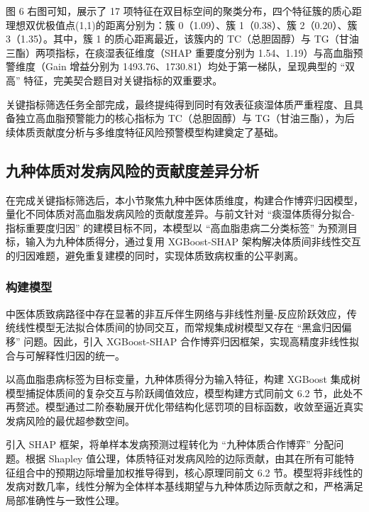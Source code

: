 \documentclass[12pt]{article}
\begin{document}
	{\songti{}
		图 6 右图可知，展示了 17 项特征在双目标空间的聚类分布，四个特征簇的质心距理想双优极值点(1,1)的距离分别为：簇 0（1.09）、簇 1（0.38）、簇 2（0.20）、簇 3（1.35）。其中，簇 1 的质心距离最近，该簇内的 TC（总胆固醇）与 TG（甘油三酯）两项指标，在痰湿表征维度（SHAP 重要度分别为 1.54、1.19）与高血脂预警维度（Gain 增益分别为 1493.76、1730.81）均处于第一梯队，呈现典型的 “双高” 特征，完美契合题目对关键指标的双重要求。
		\par}
	
	{\songti{}
		关键指标筛选任务全部完成，最终提纯得到同时有效表征痰湿体质严重程度、且具备独立高血脂预警能力的核心指标为 TC（总胆固醇）与 TG（甘油三酯），为后续体质贡献度分析与多维度特征风险预警模型构建奠定了基础。
		\par}
	
	\subsection{九种体质对发病风险的贡献度差异分析}
	{\songti{}
		在完成关键指标筛选后，本小节聚焦九种中医体质维度，构建合作博弈归因模型，量化不同体质对高血脂发病风险的贡献度差异。与前文针对 “痰湿体质得分拟合-指标重要度归因” 的建模目标不同，本模型以 “高血脂患病二分类标签” 为预测目标，输入为九种体质得分，通过复用 XGBoost-SHAP 架构解决体质间非线性交互的归因难题，避免重复建模的同时，实现体质致病权重的公平剥离。
		\par}
	
	\subsubsection{构建模型}
	{\songti{}
		中医体质致病路径中存在显著的非互斥伴生网络与非线性剂量-反应阶跃效应，传统线性模型无法拟合体质间的协同交互，而常规集成树模型又存在 “黑盒归因偏移” 问题。因此，引入 XGBoost-SHAP 合作博弈归因框架，实现高精度非线性拟合与可解释性归因的统一。
		\par}
	
	{\songti{}
		以高血脂患病标签为目标变量，九种体质得分为输入特征，构建 XGBoost 集成树模型捕捉体质间的复杂交互与阶跃阈值效应，模型构建方式同前文 6.2 节，此处不再赘述。模型通过二阶泰勒展开优化带结构化惩罚项的目标函数，收敛至逼近真实发病风险的最优超参数空间。
		\par}
	
	{\songti{}
		引入 SHAP 框架，将单样本发病预测过程转化为 “九种体质合作博弈” 分配问题。根据 Shapley 值公理，体质特征对发病风险的边际贡献，由其在所有可能特征组合中的预期边际增量加权推导得到，核心原理同前文 6.2 节。模型将非线性的发病对数几率，线性分解为全体样本基线期望与九种体质边际贡献之和，严格满足局部准确性与一致性公理。
		\par}
		
\end{document}
